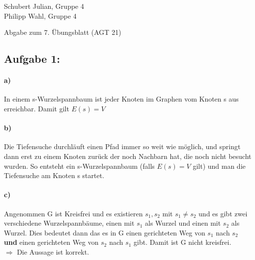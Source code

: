 \documentclass[a4paper]{article}
\begin{document}
\begin{small}
    \noindent
    Schubert Julian, Gruppe 4 \\
    Philipp Wahl, Gruppe 4
\end{small}
\bigskip

\begin{center}
    \LARGE Abgabe zum 7. Übungsblatt (AGT 21)
\end{center}
\smallskip
\subsection*{Aufgabe 1:}
\paragraph*{a)}
In einem s-Wurzelspannbaum ist jeder Knoten im Graphen
vom Knoten s aus erreichbar. Damit gilt $E(s) = V$
\paragraph*{b)}
Die Tiefensuche durchläuft einen Pfad immer so weit 
wie möglich, und springt dann erst zu einem Knoten zurück
der noch Nachbarn hat, die noch nicht besucht wurden.
So entsteht ein s-Wurzelspannbaum (falls $E(s) = V$ gilt) 
und man die Tiefensuche am Knoten s startet.
\paragraph*{c)}
Angenommen G ist Kreisfrei und es existieren $s_1, s_2$ mit 
$s_1 \neq s_2$ und es gibt zwei verschiedene Wurzelspannbäume,
einen mit $s_1$ als Wurzel und einen mit $s_2$ als Wurzel.
Dies bedeutet dann das es in G einen gerichteten Weg
von $s_1$ nach $s_2$ \textbf{und} einen gerichteten Weg
von $s_2$ nach $s_1$ gibt. Damit ist G nicht kreisfrei. \\
$\Rightarrow$ Die Aussage ist korrekt.
\end{document}

